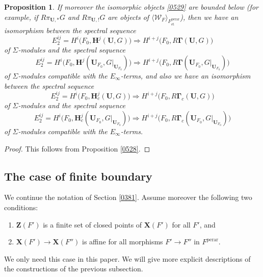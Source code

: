 \documentclass{amsart}
\newtheorem{Prop}[Thm]{Proposition}
\theoremstyle{remark}
\numberwithin{equation}{subsection}
\newcommand{\et}{\mathrm{et}}
\newcommand{\perar}{\mathrm{perar}}
\newcommand{\alg}[1]{\mathbf{#1}}
\newcommand{\genby}[1]{\langle #1 \rangle}
\begin{document}
\begin{Prop}
	If moreover the isomorphic objects \eqref{0529} are bounded below
	(for example, if $R \pi_{\alg{U}, \ast} G$ and $R \pi_{\alg{U}, !} G$ are
	objects of $\genby{\mathcal{W}_{F}}_{F^{\perar}_{\et}}$),
	then we have an isomorphism between the spectral sequence
		\[
				E_{2}^{i j}
			=
				H^{i} \bigl(
					F_{0},
					\alg{H}^{j}(\alg{U}, G)
				\bigr)
			\Longrightarrow
				H^{i + j} \bigl(
					F_{0},
					R \alg{\Gamma}(\alg{U}, G)
				\bigr)
		\]
	of $\Sigma$-modules and the spectral sequence
		\[
				E_{2}^{i j}
			=
				H^{i} \bigl(
					F_{0},
					\alg{H}^{j}(
						\alg{U}_{F_{0}},
						G|_{\alg{U}_{F_{0}}}
					)
				\bigr)
			\Longrightarrow
				H^{i + j} \bigl(
					F_{0},
					R \alg{\Gamma}(
						\alg{U}_{F_{0}},
						G|_{\alg{U}_{F_{0}}}
					)
				\bigr)
		\]
	of $\Sigma$-modules compatible with the $E_{\infty}$-terms,
	and also we have an isomorphism between the spectral sequence
		\[
				E_{2}^{i j}
			=
				H^{i} \bigl(
					F_{0},
					\alg{H}_{c}^{j}(\alg{U}, G)
				\bigr)
			\Longrightarrow
				H^{i + j} \bigl(
					F_{0},
					R \alg{\Gamma}_{c}(\alg{U}, G)
				\bigr)
		\]
	of $\Sigma$-modules and the spectral sequence
		\[
				E_{2}^{i j}
			=
				H^{i} \bigl(
					F_{0},
					\alg{H}_{c}^{j}(
						\alg{U}_{F_{0}},
						G|_{\alg{U}_{F_{0}}}
					)
				\bigr)
			\Longrightarrow
				H^{i + j} \bigl(
					F_{0},
					R \alg{\Gamma}_{c}(
						\alg{U}_{F_{0}},
						G|_{\alg{U}_{F_{0}}}
					)
				\bigr)
		\]
	of $\Sigma$-modules compatible with the $E_{\infty}$-terms.
\end{Prop}

\begin{proof}
	This follows from Proposition \ref{0528}.
\end{proof}


\subsection{The case of finite boundary}
\label{0436}

We continue the notation of Section \ref{0381}.
Assume moreover the following two conditions:
\begin{enumerate}
	\item
		$\alg{Z}(F')$ is a finite set of closed points of $\alg{X}(F')$ for all $F'$, and
	\item
		$\alg{X}(F') \to \alg{X}(F'')$ is affine for all morphisms $F' \to F''$ in $F^{\perar}$.
\end{enumerate}
We only need this case in this paper.
We will give more explicit descriptions of the constructions of the previous subsection.
\end{document}
